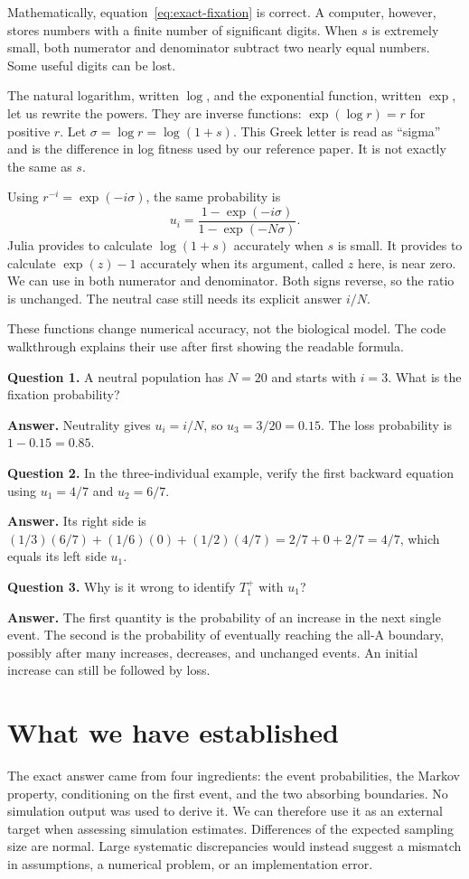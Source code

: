 Mathematically, equation~\eqref{eq:exact-fixation} is correct. A computer,
however, stores numbers with a finite number of significant digits. When
\(s\) is extremely small, both numerator and denominator subtract two
nearly equal numbers. Some useful digits can be lost.

The natural logarithm, written \(\log\), and the exponential function,
written \(\exp\), let us rewrite the powers. They are inverse functions:
\(\exp(\log r)=r\) for positive \(r\). Let
\(\sigma=\log r=\log(1+s)\). This Greek letter is read as ``sigma'' and
is the difference in log fitness used by our reference paper. It is not
exactly the same as \(s\).

Using \(r^{-i}=\exp(-i\sigma)\), the same probability is
\[
 u_i=\frac{1-\exp(-i\sigma)}{1-\exp(-N\sigma)}.
\]
Julia provides  to calculate \(\log(1+s)\) accurately
when \(s\) is small. It provides  to calculate
\(\exp(z)-1\) accurately when its argument, called \(z\) here, is near
zero. We can use  in both numerator and denominator. Both signs
reverse, so the ratio is unchanged. The neutral case still needs its explicit
answer \(i/N\).

These functions change numerical accuracy, not the biological model. The
code walkthrough explains their use after first showing the readable formula.

\begin{checkpoint}
\textbf{Question 1.} A neutral population has \(N=20\) and starts with
\(i=3\). What is the fixation probability?

\textbf{Answer.} Neutrality gives \(u_i=i/N\), so
\(u_3=3/20=0.15\). The loss probability is \(1-0.15=0.85\).

\textbf{Question 2.} In the three-individual example, verify the first
backward equation using \(u_1=4/7\) and \(u_2=6/7\).

\textbf{Answer.} Its right side is
\((1/3)(6/7)+(1/6)(0)+(1/2)(4/7)=2/7+0+2/7=4/7\), which equals its
left side \(u_1\).

\textbf{Question 3.} Why is it wrong to identify \(T_1^+\) with \(u_1\)?

\textbf{Answer.} The first quantity is the probability of an increase in
the next single event. The second is the probability of eventually reaching
the all-A boundary, possibly after many increases, decreases, and unchanged
events. An initial increase can still be followed by loss.
\end{checkpoint}

\section{What we have established}

The exact answer came from four ingredients: the event probabilities, the
Markov property, conditioning on the first event, and the two absorbing
boundaries. No simulation output was used to derive it. We can therefore
use it as an external target when assessing simulation estimates. Differences
of the expected sampling size are normal. Large systematic discrepancies
would instead suggest a mismatch in assumptions, a numerical problem, or
an implementation error.

